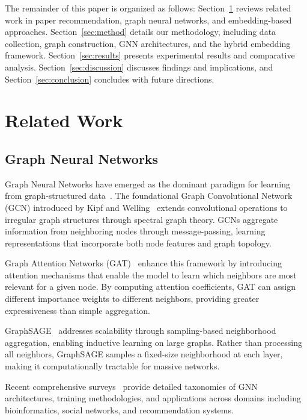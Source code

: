 \documentclass[pdflatex,sn-mathphys-num]{sn-jnl}
\theoremstyle{thmstyleone}%
\theoremstyle{thmstyletwo}%
\theoremstyle{thmstylethree}%
\begin{document}
The remainder of this paper is organized as follows: Section~\ref{sec:related} reviews related work in paper recommendation, graph neural networks, and embedding-based approaches. Section~\ref{sec:method} details our methodology, including data collection, graph construction, GNN architectures, and the hybrid embedding framework. Section~\ref{sec:results} presents experimental results and comparative analysis. Section~\ref{sec:discussion} discusses findings and implications, and Section~\ref{sec:conclusion} concludes with future directions.

\section{Related Work}\label{sec:related}

\subsection{Graph Neural Networks}

Graph Neural Networks have emerged as the dominant paradigm for learning from graph-structured data~\cite{wu2019comprehensive}. The foundational Graph Convolutional Network (GCN) introduced by Kipf and Welling~\cite{kipf2017semi} extends convolutional operations to irregular graph structures through spectral graph theory. GCNs aggregate information from neighboring nodes through message-passing, learning representations that incorporate both node features and graph topology.

Graph Attention Networks (GAT)~\cite{veličković2018graph} enhance this framework by introducing attention mechanisms that enable the model to learn which neighbors are most relevant for a given node. By computing attention coefficients, GAT can assign different importance weights to different neighbors, providing greater expressiveness than simple aggregation.

GraphSAGE~\cite{hamilton2017inductive} addresses scalability through sampling-based neighborhood aggregation, enabling inductive learning on large graphs. Rather than processing all neighbors, GraphSAGE samples a fixed-size neighborhood at each layer, making it computationally tractable for massive networks.

Recent comprehensive surveys~\cite{khemani2024review,zhou2020graph} provide detailed taxonomies of GNN architectures, training methodologies, and applications across domains including bioinformatics, social networks, and recommendation systems.
\end{document}
